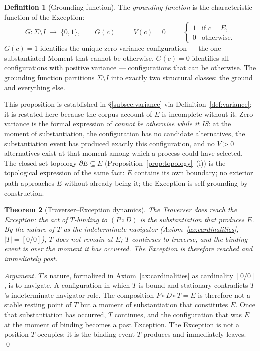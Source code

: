 \documentclass[11pt,a4paper]{article}
\newtheorem{theorem}{Theorem}[section]
\theoremstyle{definition}
\newtheorem{definition}[theorem]{Definition}
\theoremstyle{remark}
\begin{document}
\begin{definition}[Grounding function]\label{def:grounding}
The \emph{grounding function} is the characteristic function of the Exception:
\[
G : \Sigma \setminus I \;\to\; \{0, 1\}, \qquad G(c) \;=\; [V(c) = 0] \;=\; \begin{cases} 1 & \text{if } c = E, \\ 0 & \text{otherwise.}\end{cases}
\]
$G(c) = 1$ identifies the unique zero-variance configuration --- the one substantiated Moment that cannot be otherwise. $G(c) = 0$ identifies all configurations with positive variance --- configurations that can be otherwise. The grounding function partitions $\Sigma \setminus I$ into exactly two structural classes: the ground and everything else.
\end{definition}

This proposition is established in \S\ref{subsec:variance} via Definition~\ref{def:variance}; it is restated here because the corpus account of $E$ is incomplete without it. Zero variance is the formal expression of \emph{cannot be otherwise while it IS}: at the moment of substantiation, the configuration has no candidate alternatives, the substantiation event has produced exactly this configuration, and no $V > 0$ alternatives exist at that moment among which a process could have selected. The closed-set topology $\partial E \subseteq E$ (Proposition~\ref{prop:topology}~(i)) is the topological expression of the same fact: $E$ contains its own boundary; no exterior path approaches $E$ without already being it; the Exception is self-grounding by construction.

\begin{theorem}[Traverser--Exception dynamics]\label{thm:exception-T-dynamics}
The Traverser does reach the Exception: the act of $T$-binding to $(P\circ D)$ \emph{is} the substantiation that produces $E$. By the nature of $T$ as the indeterminate navigator (Axiom~\ref{ax:cardinalities}, $|T| = [0/0]$), $T$ does not remain at $E$; $T$ continues to traverse, and the binding event is over the moment it has occurred. The Exception is therefore reached and immediately past.
\end{theorem}

\begin{proof}[Argument]
$T$'s nature, formalized in Axiom~\ref{ax:cardinalities} as cardinality $[0/0]$, is to navigate. A configuration in which $T$ is bound and stationary contradicts $T$'s indeterminate-navigator role. The composition $P\circ D\circ T = E$ is therefore not a stable resting point of $T$ but a moment of substantiation that constitutes $E$. Once that substantiation has occurred, $T$ continues, and the configuration that was $E$ at the moment of binding becomes a past Exception. The Exception is not a position $T$ occupies; it is the binding-event $T$ produces and immediately leaves. \qed
\end{proof}
\end{document}
